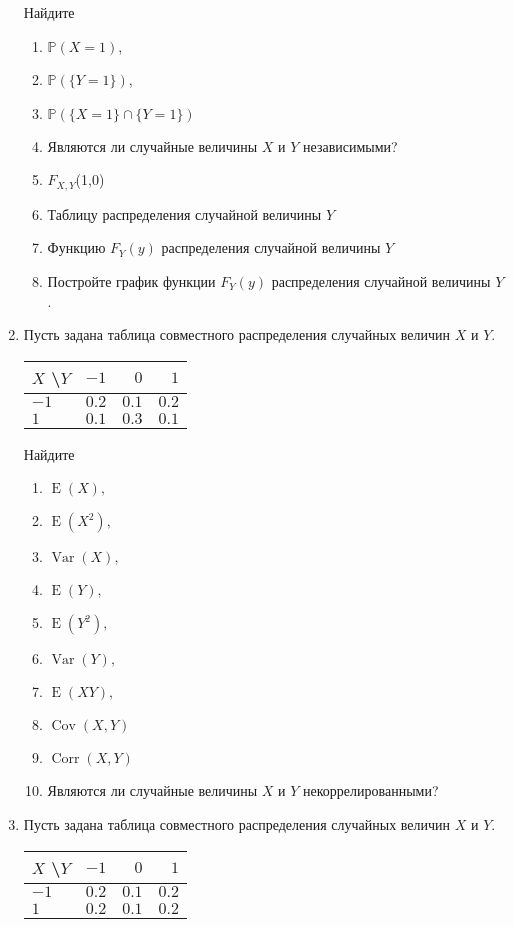 \documentclass[12pt]{article}
\DeclareMathOperator{\Cov}{Cov}
\DeclareMathOperator{\Corr}{Corr}
\DeclareMathOperator{\Var}{Var}
\DeclareMathOperator{\E}{E}
\def \P{\mathbb{P}}
\begin{document}
\begin{enumerate}
Найдите
\begin{enumerate}
\item $\P(X = 1)$,
\item $\P(\{Y = 1\})$,
\item $\P(\{X = 1\}\cap\{Y = 1\})$
\item Являются ли случайные величины $X$ и $Y$ независимыми?
\item $F_{X,Y}$(1,0)
\item Таблицу распределения случайной величины $Y$
\item Функцию $F_{Y}(y)$ распределения случайной величины $Y$
\item Постройте график функции $F_{Y}(y)$ распределения случайной величины $Y$.
\end{enumerate}

\item Пусть задана таблица совместного распределения случайных величин $X$ и $Y$.

\begin{center}\begin{tabular}{l|rrr}
\toprule
 $X$ \textbackslash $Y$    & $-1$  & $0$   & $1$   \\ \midrule
$-1$                 & $0.2$ & $0.1$ & $0.2$ \\
 $1$                 & $0.1$ & $0.3$ & $0.1$ \\ \bottomrule
\end{tabular}\end{center}

Найдите
\begin{enumerate}
    \item $\E(X),$
    \item $\E(X^{2}),$
	\item $\Var(X),$
    \item $\E(Y),$
    \item $\E(Y^{2}),$
    \item $\Var(Y),$
    \item $\E(XY),$
	\item $\Cov(X,Y)$
    \item $\Corr(X,Y)$
    \item Являются ли случайные величины $X$ и $Y$ некоррелированными?
\end{enumerate}

\item Пусть задана таблица совместного распределения случайных величин $X$ и $Y$.

\begin{center}\begin{tabular}{l|rrr}
\toprule
 $X$ \textbackslash $Y$    & $-1$  &$ 0 $  & $1 $  \\ \midrule
$-1$                 & $0.2$ & $0.1$ & $0.2$ \\
 $1$                 & $0.2$ & $0.1$ & $0.2$ \\ \bottomrule
\end{tabular}\end{center}


\end{enumerate}
\end{document}
